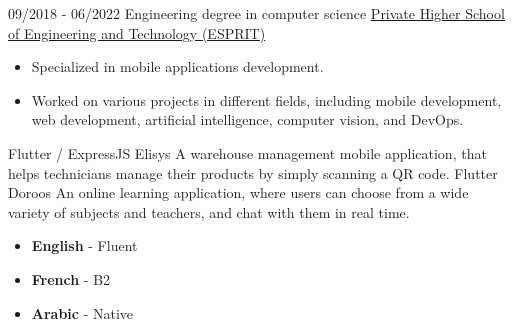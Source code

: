 \documentclass[9pt]{developercv} %
\begin{document}
\vspace{-10 pt}
\begin{entrylist}
	\entry
	{09/2018 - 06/2022}
	{Engineering degree in computer science}
	{\href{https://www.esprit.tn}{Private Higher School of Engineering and Technology (ESPRIT)}}
	{
		\begin{itemize}[noitemsep,topsep=0pt,parsep=0pt,partopsep=0pt, leftmargin=0pt]
			\item Specialized in mobile applications development.
			\item Worked on various projects in different fields, including mobile development, web development, artificial intelligence, computer vision, and DevOps.

		\end{itemize}
	}
\end{entrylist}

\begin{entrylist}
	\entry
	{Flutter / ExpressJS}
	{Elisys}
	{
	}
	{
		A warehouse management mobile application, that helps technicians manage their products by simply scanning a QR code.
	}
	\entry
	{Flutter}
	{Doroos}
	{
	}
	{
		An online learning application, where users can choose from a wide variety of subjects and teachers, and chat with them in real time.
	}
\end{entrylist}




\vspace{-10 pt}
\vspace{-6pt}

\begin{itemize}[noitemsep,topsep=0pt,parsep=0pt,partopsep=0pt, leftmargin=0.18\textwidth]
	\item \textbf{English} - Fluent
	\item \textbf{French} - B2
	\item \textbf{Arabic} - Native
\end{itemize}


\end{document}
